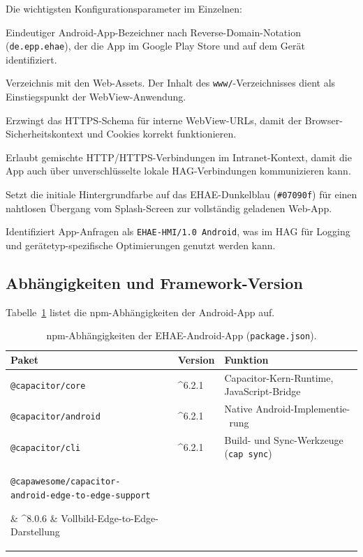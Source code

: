 ﻿\documentclass[12pt,a4paper]{article}
\begin{document}
Die wichtigsten Konfigurationsparameter im Einzelnen:

\begin{description}[leftmargin=2em]
  \item[\texttt{appId}] Eindeutiger Android-App-Bezeichner nach Reverse-Domain-Notation
    (\texttt{de.epp.ehae}), der die App im Google Play Store und auf dem Gerät identifiziert.
  \item[\texttt{webDir}] Verzeichnis mit den Web-Assets. Der Inhalt des
    \texttt{www/}-Verzeichnisses dient als Einstiegspunkt der WebView-Anwendung.
  \item[\texttt{androidScheme: "https"}] Erzwingt das HTTPS-Schema für interne
    WebView-URLs, damit der Browser-Sicherheitskontext und Cookies korrekt
    funktionieren.
  \item[\texttt{allowMixedContent}] Erlaubt gemischte HTTP/HTTPS-Verbindungen im
    Intranet-Kontext, damit die App auch über unverschlüsselte lokale HAG-Verbindungen
    kommunizieren kann.
  \item[\texttt{backgroundColor}] Setzt die initiale Hintergrundfarbe auf das
    EHAE-Dunkelblau (\texttt{\#07090f}) für einen nahtlosen Übergang vom Splash-Screen
    zur vollständig geladenen Web-App.
  \item[\texttt{overrideUserAgent}] Identifiziert App-Anfragen als
    \texttt{EHAE-HMI/1.0 Android}, was im HAG für Logging und
    gerätetyp-spezifische Optimierungen genutzt werden kann.
\end{description}

\subsection{Abhängigkeiten und Framework-Version}

Tabelle~\ref{tab:npm_deps} listet die npm-Abhängigkeiten der Android-App auf.

\begin{table}[h]
\centering
\caption{npm-Abhängigkeiten der EHAE-Android-App (\texttt{package.json}).}
\label{tab:npm_deps}
\begin{tabularx}{\textwidth}{llX}
\toprule
\textbf{Paket} & \textbf{Version} & \textbf{Funktion} \\
\midrule
\texttt{@capacitor/core}    & \textasciicircum{}6.2.1 & Capacitor-Kern-Runtime, JavaScript-Bridge \\
\texttt{@capacitor/android} & \textasciicircum{}6.2.1 & Native Android-Implementie-\ rung \\
\texttt{@capacitor/cli}     & \textasciicircum{}6.2.1 & Build- und Sync-Werkzeuge (\texttt{cap sync}) \\
\parbox[t]{5cm}{\raggedright\texttt{@capawesome/capacitor-}\\\texttt{android-edge-to-edge-support}}
                            & \textasciicircum{}8.0.6 & Vollbild-Edge-to-Edge-Darstellung \\
\bottomrule
\end{tabularx}
\end{table}
\end{document}
